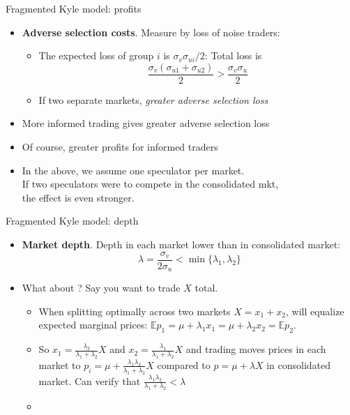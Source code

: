 \documentclass[english,10pt
,aspectratio=169
]{beamer}
\begin{document}
\begin{frame}{Fragmented Kyle model: profits}
	\begin{itemize}
		\item \textbf{Adverse selection costs}. Measure by loss of noise traders:
		\begin{itemize}
			\item The expected loss of group $i$ is $\sigma_{v} \sigma_{ui}/2$: Total loss is 
			\[
			\frac{\sigma_{v}(\sigma_{u1}+\sigma_{u2})}{2} > \frac{\sigma_{v} \sigma_{u}}{2}
			\]
			\item If two separate markets, \textit{greater adverse selection loss}
		\end{itemize}
		
		\item \alert{More informed trading gives greater adverse selection loss}
		
		\item Of course, greater profits for informed traders
		
		\item In the above, we assume one speculator per market. \\
		If two speculators were to compete in the consolidated mkt, \\
		the effect is even stronger.
	\end{itemize}
\end{frame}


\begin{frame}{Fragmented Kyle model: depth}
	\begin{itemize}
		\item \textbf{Market depth}. \alert{Depth in each market lower than in consolidated market}:
		\[
		\lambda = \frac{\sigma_v}{2 \sigma_u} < \min \{ \lambda_1, \lambda_2 \}
		\]
		
		\pause
		\item What about ? Say you want to trade $X$ total.
		\begin{itemize}
			\item When splitting optimally across two markets $X=x_1+x_2$, will equalize expected marginal prices: $\mathbb{E} p_1 = \mu + \lambda_1 x_1 = \mu + \lambda_2 x_2 = \mathbb{E} p_2$.
			\item So $x_1 = \frac{\lambda_2}{\lambda_1+\lambda_2} X$ and $x_2 = \frac{\lambda_1}{\lambda_1+\lambda_2} X$ and trading moves prices in each market to $p_i = \mu + \frac{\lambda_1 \lambda_2}{\lambda_1 + \lambda_2} X$ compared to $p = \mu + \lambda X$ in consolidated market. Can verify that $\frac{\lambda_1 \lambda_2}{\lambda_1 + \lambda_2} < \lambda$
			\item {}
		\end{itemize}
	\end{itemize}
\end{frame}
\end{document}

